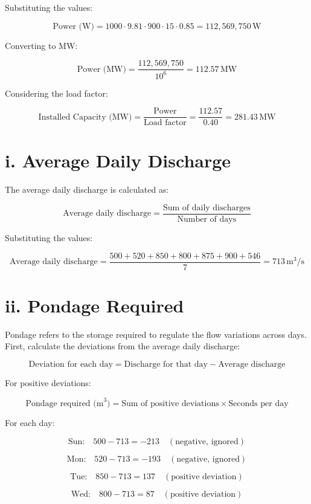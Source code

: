 \documentclass[12pt]{article}
\begin{document}
	Substituting the values:
	
	\[
	\text{Power (W)} = 1000 \cdot 9.81 \cdot 900 \cdot 15 \cdot 0.85 = 112,569,750 \, \text{W}
	\]
	
	Converting to MW:
	
	\[
	\text{Power (MW)} = \frac{112,569,750}{10^6} = 112.57 \, \text{MW}
	\]
	
	Considering the load factor:
	
	\[
	\text{Installed Capacity (MW)} = \frac{\text{Power}}{\text{Load factor}} = \frac{112.57}{0.40} = 281.43 \, \text{MW}
	\]
	
	
	
	\section*{i. Average Daily Discharge}
	
	The average daily discharge is calculated as:
	
	\[
	\text{Average daily discharge} = \frac{\text{Sum of daily discharges}}{\text{Number of days}}
	\]
	
	Substituting the values:
	
	\[
	\text{Average daily discharge} = \frac{500 + 520 + 850 + 800 + 875 + 900 + 546}{7} = 713 \, \text{m}^3/\text{s}
	\]
	
	\section*{ii. Pondage Required}
	
	Pondage refers to the storage required to regulate the flow variations across days. First, calculate the deviations from the average daily discharge:
	
	\[
	\text{Deviation for each day} = \text{Discharge for that day} - \text{Average discharge}
	\]
	
	For positive deviations:
	
	\[
	\text{Pondage required (m}^3\text{)} = \text{Sum of positive deviations} \times \text{Seconds per day}
	\]
	
	For each day:
	
	\[
	\text{Sun:} \quad 500 - 713 = -213 \quad (\text{negative, ignored})
	\]
	
	\[
	\text{Mon:} \quad 520 - 713 = -193 \quad (\text{negative, ignored})
	\]
	
	\[
	\text{Tue:} \quad 850 - 713 = 137 \quad (\text{positive deviation})
	\]
	
	\[
	\text{Wed:} \quad 800 - 713 = 87 \quad (\text{positive deviation})
	\]
	
\end{document}
